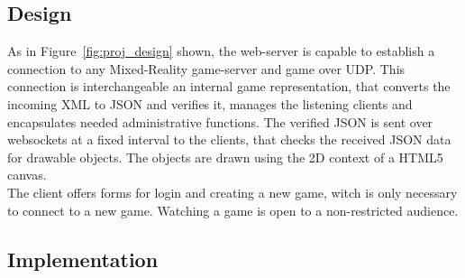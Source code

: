 \documentclass[journal]{IEEEtran}
\begin{document}
\subsection{Design}
As in Figure~\ref{fig:proj_design} shown, the web-server is capable to establish
a connection to any Mixed-Reality game-server and game over UDP. This connection
is interchangeable an internal game representation, that converts the incoming
XML to JSON and verifies it, manages the listening clients and encapsulates
needed administrative functions. The verified JSON is sent over websockets at a
fixed interval to the clients, that checks the received JSON data for drawable
objects. The objects are drawn using the 2D context of a HTML5
canvas\cite{w3c-canvas}.\\
The client offers forms for login and creating a new game, witch is only
necessary to connect to a new game. Watching a game is open to a non-restricted
audience.
\subsection{Implementation}
\end{document}

